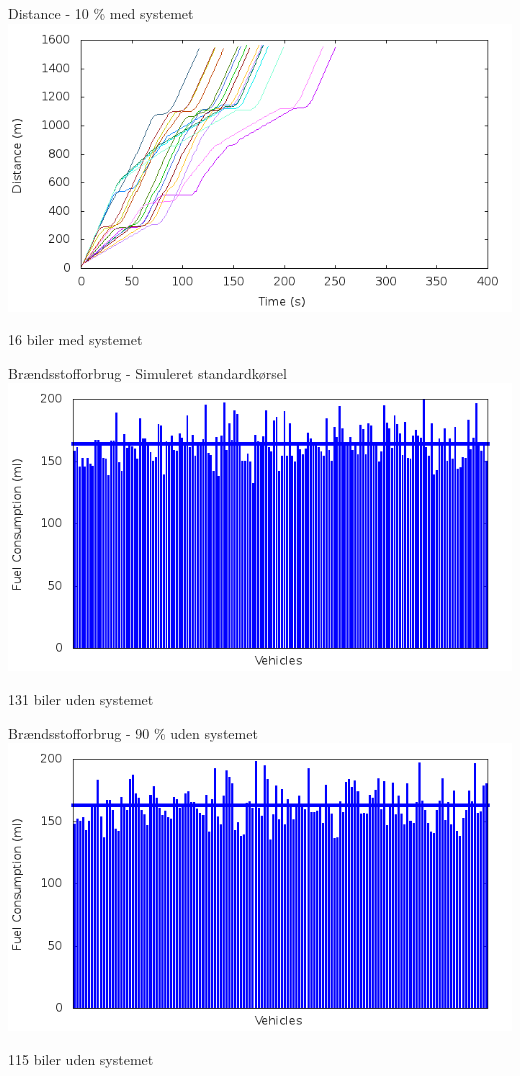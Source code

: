 \begin{frame}{Distance - 10 \% med systemet}
\includegraphics[width=1\textwidth]{../images/tp0c1_0/distanceControlled10.png}

16 biler med systemet
\end{frame}

\begin{frame}{Brændsstofforbrug - Simuleret standardkørsel}
\includegraphics[width=1\textwidth]{../images/tp0c1_0/fuelRouteUncontrolled0.png}

131 biler uden systemet
\end{frame}


\begin{frame}{Brændsstofforbrug - 90 \% uden systemet}
\includegraphics[width=1\textwidth]{../images/tp0c1_0/fuelRouteUncontrolled10.png}

115 biler uden systemet
\end{frame}

